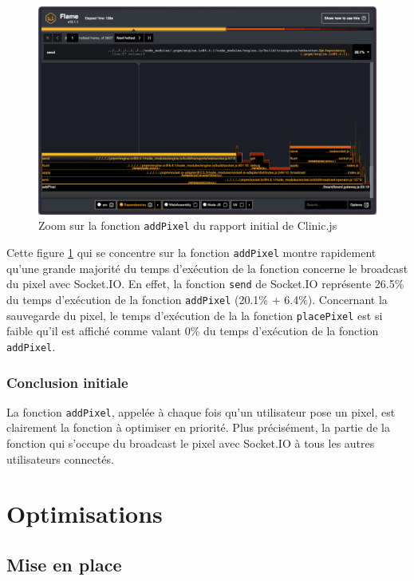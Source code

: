 \begin{figure}[H]
  \centering
  \includegraphics[width=1\textwidth]{./assets/figures/flame/flame1-addPixel.png}
  \caption{Zoom sur la fonction \texttt{addPixel} du rapport initial de Clinic.js}
  \label{fig:flame1-addPixel}
\end{figure}

Cette figure \ref{fig:flame1-addPixel} qui se concentre sur la fonction \texttt{addPixel} montre rapidement qu'une grande majorité du temps d'exécution de la fonction concerne le broadcast du pixel avec Socket.IO. En effet, la fonction \texttt{send} de Socket.IO représente 26.5\% du temps d'exécution de la fonction \texttt{addPixel} (20.1\% + 6.4\%). Concernant la sauvegarde du pixel, le temps d'exécution de la la fonction \texttt{placePixel} est si faible qu'il est affiché comme valant 0\% du temps d'exécution de la fonction \texttt{addPixel}.

\subsubsection{Conclusion initiale}

La fonction \texttt{addPixel}, appelée à chaque fois qu'un utilisateur pose un pixel, est clairement la fonction à optimiser en priorité. Plus précisément, la partie de la fonction qui s'occupe du broadcast le pixel avec Socket.IO à tous les autres utilisateurs connectés.

\section{Optimisations}
\label{sec:optimisations}

\subsection{Mise en place}

